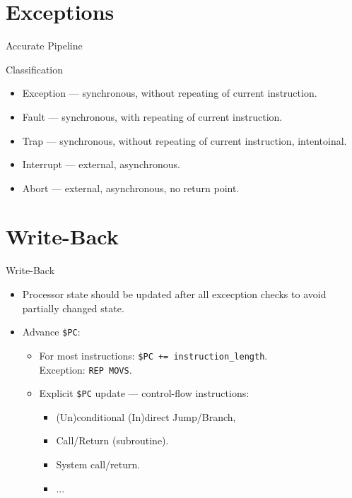 \section{Exceptions}

\begin{frame}{Accurate Pipeline}
\centering
{}
\end{frame}

\begin{frame}{Classification}
\begin{itemize}
\item Exception --- synchronous, without repeating of current instruction.
\item Fault --- synchronous, with repeating of current instruction.
\item Trap --- synchronous, without repeating of current instruction, intentoinal.
\item Interrupt --- external, asynchronous.
\item Abort --- external, asynchronous, no return point.
\end{itemize}
\end{frame}

\section{Write-Back}

\begin{frame}{Write-Back}
\begin{itemize}
  \item Processor state should be updated after all excecption checks to avoid
    partially changed state.
  \bigskip
  \item Advance \texttt{\$PC}:
  \pause\bigskip
  \begin{itemize}
    \item For most instructions: \texttt{\$PC += instruction_length}. \\
    Exception: \texttt{REP MOVS}.
    \pause\bigskip
    \item Explicit \texttt{\$PC} update --- control-flow instructions:
    \begin{itemize}
      \item (Un)conditional (In)direct Jump/Branch,
      \item Call/Return (subroutine).
      \item System call/return.
      \item ...
    \end{itemize}
  \end{itemize}
\end{itemize}
\end{frame}

